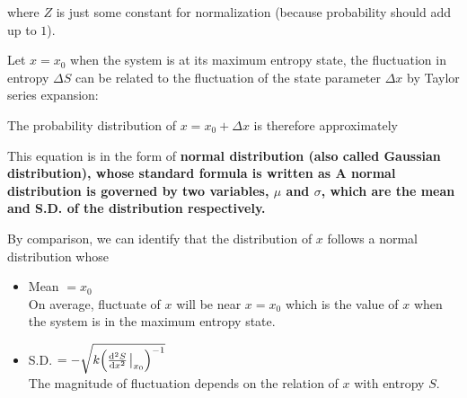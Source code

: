 \documentclass[class=article, crop=false, 12pt]{standalone}
\begin{document}
where $Z$ is just some constant for normalization (because probability should add up to $1$).

Let $x=x_0$ when the system is at its maximum entropy state,
the fluctuation in entropy $\Delta S$ can be related to 
the fluctuation of the state parameter $\Delta x$ by Taylor series expansion:

The probability distribution of $x=x_0+\Delta x$ is therefore approximately

This equation is in the form of \bf{normal distribution} (also called Gaussian distribution),
whose standard formula is written as
A normal distribution is governed by two variables, $\mu$ and $\sigma$, 
which are the mean and S.D. of the distribution respectively.


By comparison, we can identify that the distribution of $x$ follows a normal distribution whose
\begin{itemize}
    \item Mean $=x_0$\\
    On average, fluctuate of $x$ will be near $x=x_0$ 
    which is the value of $x$ when the system is in the maximum entropy state.
    
    \item S.D. $=-\sqrt{k\qty(\dv[2]{S}{x}\eval_{x_0})^{-1}}$\\
    The magnitude of fluctuation depends on the relation of $x$ with entropy $S$.

\end{itemize}
\end{document}
